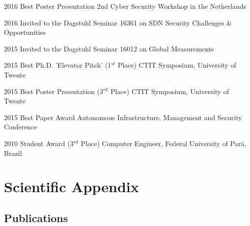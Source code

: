 \documentclass[print]{styles/friggeri-cv-mac} %
\begin{document}
\begin{entrylist}

\vspace{-0.3cm}
\entry
{2016}
{Best Poster Presentation}
{2nd Cyber Security Workshop in the Netherlands}

\vspace{-0.3cm}
\entry
{2016}
{Invited to the Dagstuhl Seminar 16361}
{on SDN Security Challenges \& Opportunities}

\vspace{-0.3cm}
\entry
{2015}
{Invited to the Dagstuhl Seminar 16012}
{on Global Measurements}

\vspace{-0.3cm}
\entry
{2015}
{Best Ph.D. 'Elevator Pitch' (1$^{st}$ Place)}
{CTIT Symposium, University of Twente}

\vspace{-0.3cm}
\entry
{2015}
{Best Poster Presentation (3$^{rd}$ Place)}
{CTIT Symposium, University of Twente}

\vspace{-0.3cm}
\entry
{2015}
{Best Paper Award}
{Autonomous Infrastructure, Management and Security Conference}


\vspace{-0.3cm}
\entry
{2010}
{Student Award (3$^{rd}$ Place)}
{Computer Engineer, Federal University of Pará, Brazil}

\end{entrylist}


\newpage
\section{Scientific Appendix}\vspace{-5pt}

\subsection{Publications}
\vspace{-1cm}
\nocite{*}
\printbibliography[title={\emptyset}]
\end{document}
